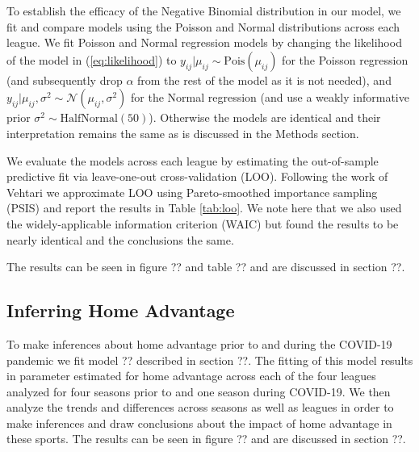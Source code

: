 To establish the efficacy of the Negative Binomial distribution in our model, we fit and compare models using the Poisson and Normal distributions across each league. We fit Poisson and Normal regression models by changing the likelihood of the model in (\ref{eq:likelihood}) to \(y_{ij} | \mu_{ij} \sim \text{Pois}(\mu_{ij})\) for the Poisson regression (and subsequently drop \(\alpha\) from the rest of the model as it is not needed), and \(y_{ij} | \mu_{ij}, \sigma^2 \sim \mathcal{N}(\mu_{ij}, \sigma^2)\) for the Normal regression (and use a weakly informative prior \(\sigma^2 \sim \text{HalfNormal}(50)\)). Otherwise the models are identical and their interpretation remains the same as is discussed in the Methods section.

We evaluate the models across each league by estimating the out-of-sample predictive fit via leave-one-out cross-validation (LOO). Following the work of Vehtari \cite{Vehtari2016} we approximate LOO using Pareto-smoothed importance sampling (PSIS) and report the results in Table \ref{tab:loo}. We note here that we also used the widely-applicable information criterion (WAIC) \cite{Watanabe2010} but found the results to be nearly identical and the conclusions the same.

The results can be seen in figure ?? and table ?? and are discussed in section ??.

\subsection{Inferring Home Advantage}
To make inferences about home advantage prior to and during the COVID-19 pandemic we fit model ?? described in section ??. The fitting of this model results in parameter estimated for home advantage across each of the four leagues analyzed for four seasons prior to and one season during COVID-19. We then analyze the trends and differences across seasons as well as leagues in order to make inferences and draw conclusions about the impact of home advantage in these sports. The results can be seen in figure ?? and are discussed in section ??.